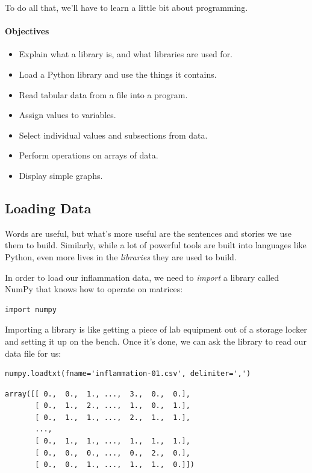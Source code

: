 \documentclass[]{book}
\newcommand{\gdef}[2]{\emph{#2}}
\begin{document}
To do all that, we'll have to learn a little bit about programming.

\mbox{}\paragraph{Objectives}

\begin{itemize}
\item
  Explain what a library is, and what libraries are used for.
\item
  Load a Python library and use the things it contains.
\item
  Read tabular data from a file into a program.
\item
  Assign values to variables.
\item
  Select individual values and subsections from data.
\item
  Perform operations on arrays of data.
\item
  Display simple graphs.
\end{itemize}

\subsection{Loading Data}

Words are useful, but what's more useful are the sentences and stories
we use them to build. Similarly, while a lot of powerful tools are built
into languages like Python, even more lives in the
\gdef{g:library}{libraries} they are used to build.

In order to load our inflammation data, we need to
\gdef{g:import}{import} a library called NumPy that knows how to
operate on matrices:

\begin{verbatim}
import numpy
\end{verbatim}

Importing a library is like getting a piece of lab equipment out of a
storage locker and setting it up on the bench. Once it's done, we can
ask the library to read our data file for us:

\begin{verbatim}
numpy.loadtxt(fname='inflammation-01.csv', delimiter=',')
\end{verbatim}

\begin{verbatim}
array([[ 0.,  0.,  1., ...,  3.,  0.,  0.],
       [ 0.,  1.,  2., ...,  1.,  0.,  1.],
       [ 0.,  1.,  1., ...,  2.,  1.,  1.],
       ...,
       [ 0.,  1.,  1., ...,  1.,  1.,  1.],
       [ 0.,  0.,  0., ...,  0.,  2.,  0.],
       [ 0.,  0.,  1., ...,  1.,  1.,  0.]])
\end{verbatim}
\end{document}
